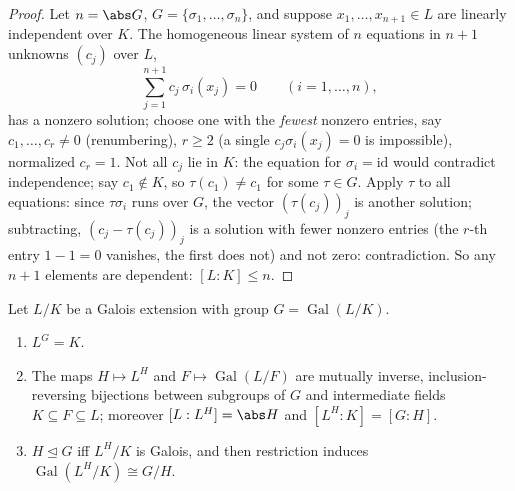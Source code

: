 \begin{proof}
Let $n = \abs G$, $G = \{\sigma_1, \dots, \sigma_n\}$, and
suppose $x_1, \dots, x_{n+1} \in L$ are linearly independent over
$K$. The homogeneous linear system of $n$ equations in $n+1$
unknowns $(c_j)$ over $L$,
\[
\sum_{j=1}^{n+1} c_j\,\sigma_i(x_j) = 0
\qquad (i = 1, \dots, n),
\]
has a nonzero solution; choose one with the \emph{fewest} nonzero
entries, say $c_1, \dots, c_r \neq 0$ (renumbering), $r \geq 2$
(a single $c_j\sigma_i(x_j) = 0$ is impossible), normalized
$c_r = 1$. Not all $c_j$ lie in $K$: the equation for $\sigma_i =
\mathrm{id}$ would contradict independence; say $c_1 \notin K$,
so $\tau(c_1) \ne c_1$ for some $\tau \in G$. Apply $\tau$ to all
equations: since $\tau\sigma_i$ runs over $G$, the vector
$(\tau(c_j))_j$ is another solution; subtracting, $(c_j -
\tau(c_j))_j$ is a solution with fewer nonzero entries (the
$r$-th entry $1 - 1 = 0$ vanishes, the first does not) and not
zero: contradiction. So any $n+1$ elements are dependent: $[L:K]
\leq n$.
\end{proof}

\begin{theorem}
\label{thm:b3:galois:fundamental}
Let $L/K$ be a Galois extension with group $G =
\operatorname{Gal}(L/K)$.
\begin{enumerate}
  \item $L^G = K$.
  \item The maps $H \mapsto L^H$ and $F \mapsto
        \operatorname{Gal}(L/F)$ are mutually inverse,
        inclusion-reversing bijections between subgroups of $G$
        and intermediate fields $K \subseteq F \subseteq L$;
        moreover $[L : L^H] = \abs H$ and $[L^H : K] = [G : H]$.
  \item $H \trianglelefteq G$ iff $L^H/K$ is Galois, and then
        restriction induces $\operatorname{Gal}(L^H/K) \cong
        G/H$.
\end{enumerate}
\end{theorem}

